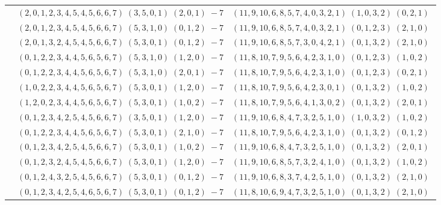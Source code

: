 \documentclass[11pt]{article}
\begin{document}
\begin{longtable}[l]{|c|c|c|}
 \cline{2-3} 
 & $(2 ,0 ,1 ,2 ,3 ,4 ,5 ,4 ,5 ,6 ,6 ,7) \;(3 ,5 ,0 ,1) \;(2 ,0 ,1) \;-7$ & $(11 ,9 ,10 ,6 ,8 ,5 ,7 ,4 ,0 ,3 ,2 ,1) \;(1 ,0 ,3 ,2) \;(0 ,2 ,1) \;$\\ 
 \cline{2-3} 
 & $(2 ,0 ,1 ,2 ,3 ,4 ,5 ,4 ,5 ,6 ,6 ,7) \;(5 ,3 ,1 ,0) \;(0 ,1 ,2) \;-7$ & $(11 ,9 ,10 ,6 ,8 ,5 ,7 ,4 ,0 ,3 ,2 ,1) \;(0 ,1 ,2 ,3) \;(2 ,1 ,0) \;$\\ 
 \cline{2-3} 
 & $(2 ,0 ,1 ,3 ,2 ,4 ,5 ,4 ,5 ,6 ,6 ,7) \;(5 ,3 ,0 ,1) \;(0 ,1 ,2) \;-7$ & $(11 ,9 ,10 ,6 ,8 ,5 ,7 ,3 ,0 ,4 ,2 ,1) \;(0 ,1 ,3 ,2) \;(2 ,1 ,0) \;$\\ 
 \cline{2-3} 
 & $(0 ,1 ,2 ,2 ,3 ,4 ,4 ,5 ,6 ,5 ,6 ,7) \;(5 ,3 ,1 ,0) \;(1 ,2 ,0) \;-7$ & $(11 ,8 ,10 ,7 ,9 ,5 ,6 ,4 ,2 ,3 ,1 ,0) \;(0 ,1 ,2 ,3) \;(1 ,0 ,2) \;$\\ 
 \cline{2-3} 
 & $(0 ,1 ,2 ,2 ,3 ,4 ,4 ,5 ,6 ,5 ,6 ,7) \;(5 ,3 ,1 ,0) \;(2 ,0 ,1) \;-7$ & $(11 ,8 ,10 ,7 ,9 ,5 ,6 ,4 ,2 ,3 ,1 ,0) \;(0 ,1 ,2 ,3) \;(0 ,2 ,1) \;$\\ 
 \cline{2-3} 
 & $(1 ,0 ,2 ,2 ,3 ,4 ,4 ,5 ,6 ,5 ,6 ,7) \;(5 ,3 ,0 ,1) \;(1 ,2 ,0) \;-7$ & $(11 ,8 ,10 ,7 ,9 ,5 ,6 ,4 ,2 ,3 ,0 ,1) \;(0 ,1 ,3 ,2) \;(1 ,0 ,2) \;$\\ 
 \cline{2-3} 
 & $(1 ,2 ,0 ,2 ,3 ,4 ,4 ,5 ,6 ,5 ,6 ,7) \;(5 ,3 ,0 ,1) \;(1 ,0 ,2) \;-7$ & $(11 ,8 ,10 ,7 ,9 ,5 ,6 ,4 ,1 ,3 ,0 ,2) \;(0 ,1 ,3 ,2) \;(2 ,0 ,1) \;$\\ 
 \cline{2-3} 
 & $(0 ,1 ,2 ,3 ,4 ,2 ,5 ,4 ,5 ,6 ,6 ,7) \;(3 ,5 ,0 ,1) \;(1 ,2 ,0) \;-7$ & $(11 ,9 ,10 ,6 ,8 ,4 ,7 ,3 ,2 ,5 ,1 ,0) \;(1 ,0 ,3 ,2) \;(1 ,0 ,2) \;$\\ 
 \cline{2-3} 
 & $(0 ,1 ,2 ,2 ,3 ,4 ,4 ,5 ,6 ,5 ,6 ,7) \;(5 ,3 ,0 ,1) \;(2 ,1 ,0) \;-7$ & $(11 ,8 ,10 ,7 ,9 ,5 ,6 ,4 ,2 ,3 ,1 ,0) \;(0 ,1 ,3 ,2) \;(0 ,1 ,2) \;$\\ 
 \cline{2-3} 
 & $(0 ,1 ,2 ,3 ,4 ,2 ,5 ,4 ,5 ,6 ,6 ,7) \;(5 ,3 ,0 ,1) \;(1 ,0 ,2) \;-7$ & $(11 ,9 ,10 ,6 ,8 ,4 ,7 ,3 ,2 ,5 ,1 ,0) \;(0 ,1 ,3 ,2) \;(2 ,0 ,1) \;$\\ 
 \cline{2-3} 
 & $(0 ,1 ,2 ,3 ,2 ,4 ,5 ,4 ,5 ,6 ,6 ,7) \;(5 ,3 ,0 ,1) \;(1 ,2 ,0) \;-7$ & $(11 ,9 ,10 ,6 ,8 ,5 ,7 ,3 ,2 ,4 ,1 ,0) \;(0 ,1 ,3 ,2) \;(1 ,0 ,2) \;$\\ 
 \cline{2-3} 
 & $(0 ,1 ,2 ,4 ,3 ,2 ,5 ,4 ,5 ,6 ,6 ,7) \;(5 ,3 ,0 ,1) \;(0 ,1 ,2) \;-7$ & $(11 ,9 ,10 ,6 ,8 ,3 ,7 ,4 ,2 ,5 ,1 ,0) \;(0 ,1 ,3 ,2) \;(2 ,1 ,0) \;$\\ 
 \cline{2-3} 
 & $(0 ,1 ,2 ,3 ,4 ,2 ,5 ,4 ,6 ,5 ,6 ,7) \;(5 ,3 ,0 ,1) \;(0 ,1 ,2) \;-7$ & $(11 ,8 ,10 ,6 ,9 ,4 ,7 ,3 ,2 ,5 ,1 ,0) \;(0 ,1 ,3 ,2) \;(2 ,1 ,0) \;$\\ 

\end{longtable}
\end{document}
